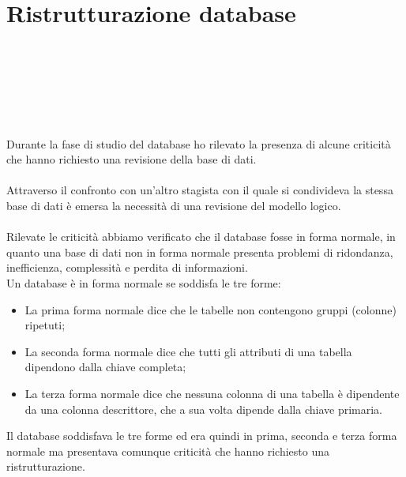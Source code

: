 
\chapter{Ristrutturazione database}
\label{cap:ristrutturazione-database}

\\\\\\\\\\\\
Durante la fase di studio del database ho rilevato la presenza di
alcune criticità che hanno richiesto una revisione della base di dati.
\\\\
Attraverso il confronto con un'altro stagista con il quale si condivideva la stessa base di dati 
è emersa la necessità di una revisione del modello logico.
\\\\
Rilevate le criticità abbiamo verificato che il database fosse in forma normale, in quanto una base 
di dati non in forma normale presenta problemi di ridondanza, inefficienza, complessità e perdita di 
informazioni.
\\
Un database è in forma normale se soddisfa le tre forme:
\\
\begin{itemize}
  \item La prima forma normale dice che le tabelle non contengono gruppi (colonne) ripetuti;
  \item La seconda forma normale dice che tutti gli attributi di una tabella dipendono dalla chiave completa;
  \item La terza forma normale dice che nessuna colonna di una tabella è dipendente da una colonna descrittore, 
  che a sua volta dipende dalla chiave primaria.
\end{itemize}
\leavevmode\newline
Il database soddisfava le tre forme ed era quindi in prima, seconda e terza forma normale ma presentava comunque criticità che hanno richiesto 
una ristrutturazione.
\\\\
